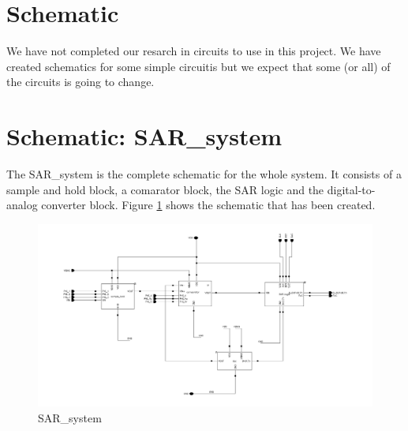\documentclass[english, a4paper,11pt]{article}
\begin{document}
\section{Schematic}
We have not completed our resarch in circuits to use in this project. We have created schematics for some simple circuitis but we expect that some (or all) of the circuits is going to change.

\section*{Schematic: SAR\_system}
The SAR\_system is the complete schematic for the whole system. It consists of a sample and hold block, a comarator block, the SAR logic and the digital-to-analog converter block. Figure 
\ref{sar:system} shows the schematic that has been created.\\
\begin{figure}[!ht]
 \centering
   \includegraphics[width=\textwidth]{img/SAR_system}
   \caption{SAR\_system}
   \label{sar:system}
\end{figure}
\end{document}
